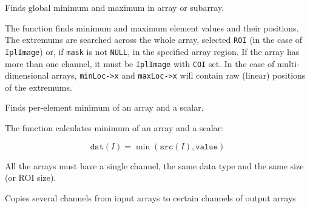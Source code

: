 Finds global minimum and maximum in array or subarray.


\begin{description}
\end{description}

The function finds minimum and maximum element values
and their positions. The extremums are searched across the whole array,
selected \texttt{ROI} (in the case of \texttt{IplImage}) or, if \texttt{mask}
is not \texttt{NULL}, in the specified array region. If the array has
more than one channel, it must be \texttt{IplImage} with \texttt{COI}
set. In the case of multi-dimensional arrays, \texttt{minLoc->x} and \texttt{maxLoc->x}
will contain raw (linear) positions of the extremums.

Finds per-element minimum of an array and a scalar.


\begin{description}
\end{description}

The function calculates minimum of an array and a scalar:

\[
\texttt{dst}(I)=\min(\texttt{src}(I), \texttt{value})
\]

All the arrays must have a single channel, the same data type and the same size (or ROI size).


Copies several channels from input arrays to certain channels of output arrays


